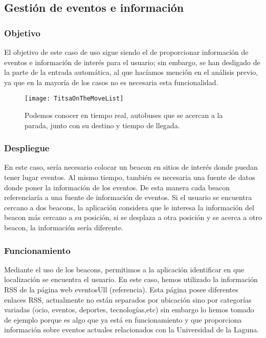 \subsection{Gestión de eventos e información}

\subsubsection{Objetivo}

El objetivo de este caso de uso sigue siendo el de proporcionar información de eventos e información de interés para el usuario; sin embargo, se han desligado de la parte de la entrada automática, al que hacíamos mención en el análisis previo, ya que en la mayoría de los casos no es necesaria esta funcionalidad.  

\begin{figure}[H]
	\centering
	\texttt{[image: TitsaOnTheMoveList]}
	\caption{Podemos conocer en tiempo real, autobuses que se acercan a la parada, junto con su destino y tiempo de llegada.}
	\label{fig:titsaOnTheMoveList}
\end{figure}

\subsubsection{Despliegue}


En este caso, sería necesario colocar un beacon en sitios de interés donde puedan tener lugar eventos. Al mismo tiempo, también es necesaria una fuente de datos donde poner la información de los eventos. De esta manera cada beacon referenciaría a una fuente de información de eventos. Si el usuario se encuentra cercano a dos beacons, la aplicación considera que le interesa la información del beacon más cercano a su posición, si se desplaza a otra posición y se acerca a otro beacon, la información sería diferente.

\subsubsection{Funcionamiento}


Mediante el uso de los beacons, permitimos a la aplicación identificar en que localización se encuentra el usuario. En este caso, hemos utilizado la información RSS de la página web eventosUll (referencia). Esta página posee diferentes enlaces RSS, actualmente no están separados por ubicación sino por categorías variadas (ocio, eventos, deportes, tecnologías,etc) sin embargo lo hemos tomado de ejemplo porque es algo que ya está en funcionamiento y que proporciona información sobre eventos actuales relacionados con la Universidad de la Laguna. 

